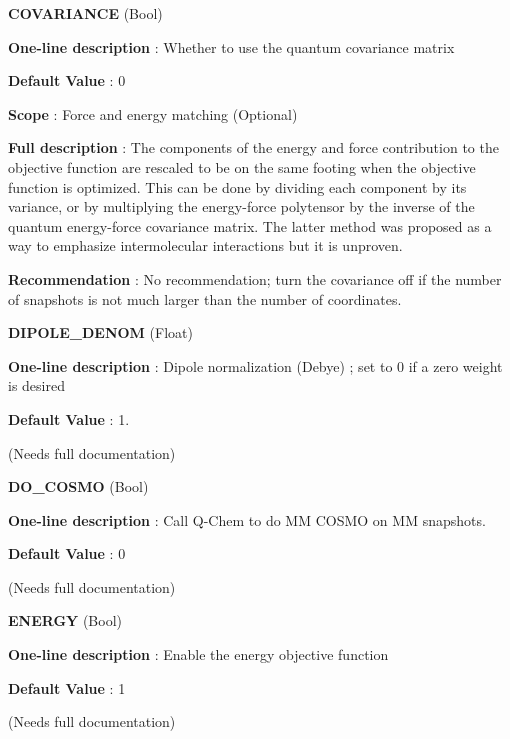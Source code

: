 \begin{DoxyItemize}
\item {\bfseries  \-C\-O\-V\-A\-R\-I\-A\-N\-C\-E } (\-Bool) \par
{\bfseries  \-One-\/line description }\-: \-Whether to use the quantum covariance matrix \par
{\bfseries  \-Default \-Value }\-: 0 \par
{\bfseries  \-Scope }\-: \-Force and energy matching (\-Optional) \par
{\bfseries  \-Full description }\-: \-The components of the energy and force contribution to the objective function are rescaled to be on the same footing when the objective function is optimized. \-This can be done by dividing each component by its variance, or by multiplying the energy-\/force polytensor by the inverse of the quantum energy-\/force covariance matrix. \-The latter method was proposed as a way to emphasize intermolecular interactions but it is unproven. \par
{\bfseries  \-Recommendation }\-: \-No recommendation; turn the covariance off if the number of snapshots is not much larger than the number of coordinates.\end{DoxyItemize}
\begin{DoxyItemize}
\item {\bfseries  \-D\-I\-P\-O\-L\-E\-\_\-\-D\-E\-N\-O\-M } (\-Float) \par
{\bfseries  \-One-\/line description }\-: \-Dipole normalization (\-Debye) ; set to 0 if a zero weight is desired \par
{\bfseries  \-Default \-Value }\-: 1. \par
(\-Needs full documentation)\end{DoxyItemize}
\begin{DoxyItemize}
\item {\bfseries  \-D\-O\-\_\-\-C\-O\-S\-M\-O } (\-Bool) \par
{\bfseries  \-One-\/line description }\-: \-Call \-Q-\/\-Chem to do \-M\-M \-C\-O\-S\-M\-O on \-M\-M snapshots. \par
{\bfseries  \-Default \-Value }\-: 0 \par
(\-Needs full documentation)\end{DoxyItemize}
\begin{DoxyItemize}
\item {\bfseries  \-E\-N\-E\-R\-G\-Y } (\-Bool) \par
{\bfseries  \-One-\/line description }\-: \-Enable the energy objective function \par
{\bfseries  \-Default \-Value }\-: 1 \par
(\-Needs full documentation)\end{DoxyItemize}
